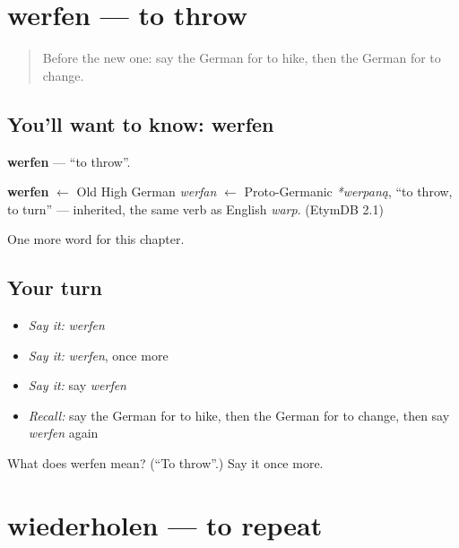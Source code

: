 \section[werfen]{werfen — to throw}

\label{lesson:GE-C153-werfen}



\begin{quote}
Before the new one: say the German for to hike, then the German for to change.
\end{quote}

\subsection*{You'll want to know: werfen}
\textbf{werfen} — \textquotedblleft{}to throw\textquotedblright{}.

\begin{cousinweb}
\textbf{werfen} $\leftarrow$ Old High German \emph{werfan} $\leftarrow$ Proto-Germanic \emph{*werpaną}, \textquotedblleft{}to throw, to turn\textquotedblright{} — inherited, the same verb as English \emph{warp}. (EtymDB 2.1)
\end{cousinweb}

\begin{grammarlens}[title={What you've built}]
One more word for this chapter.
\end{grammarlens}

\subsection*{Your turn}
\begin{itemize}
\raggedright
  \item \emph{Say it:} \emph{werfen}
  \item \emph{Say it:} \emph{werfen}, once more
  \item \emph{Say it:} say \emph{werfen}
  \item \emph{Recall:} say the German for to hike, then the German for to change, then say \emph{werfen} again
\end{itemize}

\begin{tcolorbox}[breakable,colback=teal!4,colframe=teal!35!black,title={Before you move on}]
What does werfen mean? (\textquotedblleft{}To throw\textquotedblright{}.) Say it once more.
\end{tcolorbox}
\section[wiederholen]{wiederholen — to repeat}

